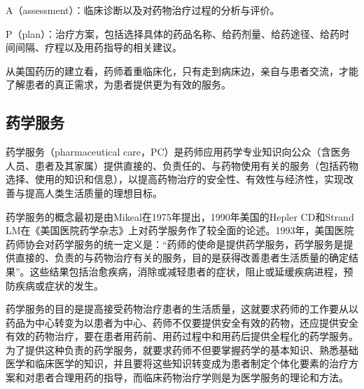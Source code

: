 A（assessment）：临床诊断以及对药物治疗过程的分析与评价。

P（plan）：治疗方案，包括选择具体的药品名称、给药剂量、给药途径、给药时间间隔、疗程以及用药指导的相关建议。

从美国药历的建立看，药师着重临床化，只有走到病床边，亲自与患者交流，才能了解患者的真正需求，为患者提供更为有效的服务。

\subsection{药学服务}

药学服务（pharmaceutical
care，PC）是药师应用药学专业知识向公众（含医务人员、患者及其家属）提供直接的、负责任的、与药物使用有关的服务（包括药物选择、使用的知识和信息），以提高药物治疗的安全性、有效性与经济性，实现改善与提高人类生活质量的理想目标。

药学服务的概念最初是由Mikeal在1975年提出，1990年美国的Hepler CD和Strand
LM在《美国医院药学杂志》上对药学服务作了较全面的论述。1993年，美国医院药师协会对药学服务的统一定义是：“药师的使命是提供药学服务，药学服务是提供直接的、负责的与药物治疗有关的服务，目的是获得改善患者生活质量的确定结果”。这些结果包括治愈疾病，消除或减轻患者的症状，阻止或延缓疾病进程，预防疾病或症状的发生。

药学服务的目的是提高接受药物治疗患者的生活质量，这就要求药师的工作要从以药品为中心转变为以患者为中心、药师不仅要提供安全有效的药物，还应提供安全有效的药物治疗，要在患者用药前、用药过程中和用药后提供全程化的药学服务。为了提供这种负责的药学服务，就要求药师不但要掌握药学的基本知识、熟悉基础医学和临床医学的知识，并且要将这些知识转变成为患者制定个体化要素的治疗方案和对患者合理用药的指导，而临床药物治疗学则是为医学服务的理论和方法。

